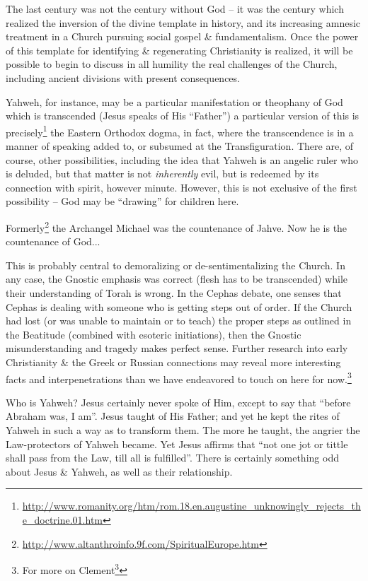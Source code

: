 The last century was not the century without God -- it was the century which realized the inversion of the divine template in history, and its increasing amnesic treatment in a Church pursuing social gospel \& fundamentalism. Once the power of this template for identifying \& regenerating Christianity is realized, it will be possible to begin to discuss in all humility the real challenges of the Church, including ancient divisions with present consequences.

Yahweh, for instance, may be a particular manifestation or theophany of God which is transcended (Jesus speaks of His ``Father'') a particular version of this is precisely\footnote{\url{http://www.romanity.org/htm/rom.18.en.augustine\_unknowingly\_rejects\_the\_doctrine.01.htm}} the Eastern Orthodox dogma, in fact, where the transcendence is in a manner of speaking added to, or subsumed at the Transfiguration. There are, of course, other possibilities, including the idea that Yahweh is an angelic ruler who is deluded, but that matter is not \emph{inherently} evil, but is redeemed by its connection with spirit, however minute. However, this is not exclusive of the first possibility -- God may be ``drawing'' for children here.

\begin{quotex}
Formerly\footnote{\url{http://www.altanthroinfo.9f.com/SpiritualEurope.htm}} the Archangel Michael was the countenance of Jahve. Now he is the countenance of God... 
\end{quotex}

This is probably central to demoralizing or de-sentimentalizing the Church. In any case, the Gnostic emphasis was correct (flesh has to be transcended) while their understanding of Torah is wrong. In the Cephas debate, one senses that Cephas is dealing with someone who is getting steps out of order. If the Church had lost (or was unable to maintain or to teach) the proper steps as outlined in the Beatitude (combined with esoteric initiations), then the Gnostic misunderstanding and tragedy makes perfect sense. Further research into early Christianity \& the Greek or Russian connections may reveal more interesting facts and interpenetrations than we have endeavored to touch on here for now.\footnote{For more on Clement\footnote{\url{http://jacksonsnyder.com/arc/bible-news/apostolia/index.htm}}}

Who is Yahweh? Jesus certainly never spoke of Him, except to say that ``before Abraham was, I am''. Jesus taught of His Father; and yet he kept the rites of Yahweh in such a way as to transform them. The more he taught, the angrier the Law-protectors of Yahweh became. Yet Jesus affirms that ``not one jot or tittle shall pass from the Law, till all is fulfilled''. There is certainly something odd about Jesus \& Yahweh, as well as their relationship.

